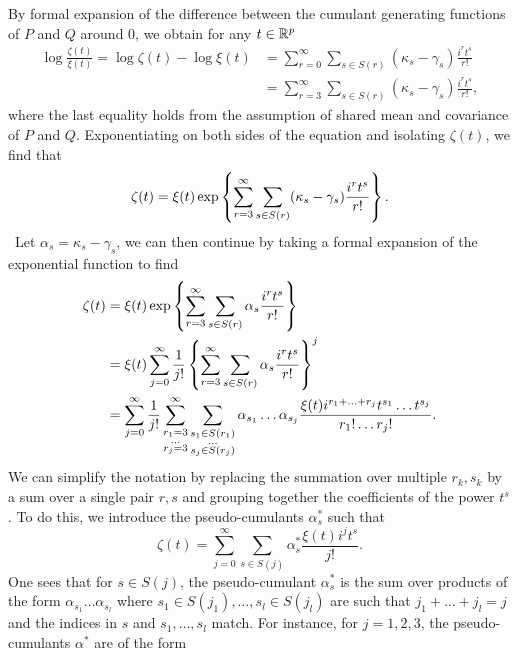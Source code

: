 By formal expansion of the difference between the cumulant generating functions of $P$ and $Q$ around 0, we obtain for any $t \in {\mathbb{R}^p}$
\begin{align*}
    \log \frac{\zeta(t)}{\xi(t)}
    = \log \zeta(t) - \log \xi(t) 
    &= \sum_{r=0}^\infty \sum_{s \in S(r)} (\kappa_s - \gamma_s)\frac{i^r t^s}{r!}\\
    &= \sum_{r=3}^\infty \sum_{s \in S(r)} (\kappa_s - \gamma_s)\frac{i^r t^s}{r!},
\end{align*}
where the last equality holds from the assumption of shared mean and covariance of $P$ and $Q$. Exponentiating on both sides of the equation and isolating $\zeta(t)$, we find that
\begin{equation*}
    \zeta(t) = \xi(t)\exp\left\{\sum_{r=3}^\infty \sum_{s \in S(r)} (\kappa_s - \gamma_s)\frac{i^r t^s}{r!}\right\}.
\end{equation*}
\
Let $\alpha_s = \kappa_s - \gamma_s$, we can then continue by taking a formal expansion of the exponential function to find
\begin{align*}
    \zeta(t)
    &= \xi(t)\exp\left\{\sum_{r=3}^\infty \sum_{s \in S(r)} \alpha_s\frac{i^r t^s}{r!}\right\}\\
    &= \xi(t)\sum_{j=0}^\infty \frac{1}{j!} \left\{\sum_{r=3}^\infty \sum_{s \in S(r)} \alpha_s\frac{i^r t^s}{r!}\right\}^j \\
    &=
    \sum_{j=0}^\infty \frac{1}{j!} 
    \sum_{\substack{r_1 = 3\\ \ldots \\r_j = 3}}^\infty
    \sum_{\substack{s_1 \in S(r_1)\\ \ldots \\s_j \in S(r_j)}}
    \alpha_{s_1}\ldots\alpha_{s_j}
    \frac{
        \xi(t) i^{r_1 + \ldots + r_j}
        t^{s_1} \ldots t^{s_j}
    }{
        r_1! \ldots r_j!
    }.
\end{align*}
We can simplify the notation by replacing the summation over multiple $r_k, s_k$ by a sum over a single pair $r, s$ and grouping together the coefficients of the power $t^s$. To do this, we introduce the pseudo-cumulants $\alpha^*_s$ such that
\begin{equation*}
    \zeta(t) = 
    \sum_{j=0}^\infty 
    \sum_{s \in S(j)}
    \alpha^*_s \frac{\xi(t) i^{j} t^{s}}{j!}.
\end{equation*}
One sees that for $s \in S(j)$, the pseudo-cumulant $\alpha^*_s$ is the sum over products of the form $\alpha_{s_1}\ldots\alpha_{s_l}$ where $s_1 \in S(j_1), \ldots, s_l \in S(j_l)$ are such that $j_1 + \ldots + j_l = j$ and the indices in $s$ and $s_1, \ldots, s_l$ match. For instance, for $j = 1, 2, 3$, the pseudo-cumulants $\alpha^*$ are of the form
